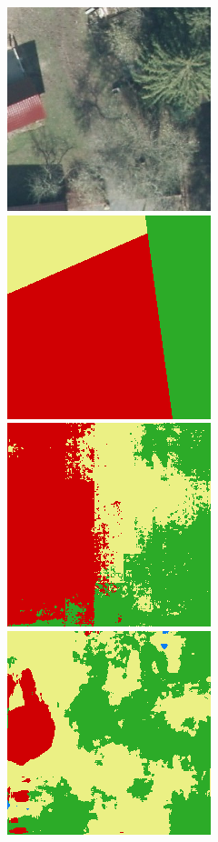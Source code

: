 \begin{figure}
    \vspace{3mm}
    \includegraphics[width=\DensenetPredictionsImageWidth]{images/densenet/768909-image} \hfill
    \includegraphics[width=\DensenetPredictionsImageWidth]{images/densenet/768909-label} \hfill
    \includegraphics[width=\DensenetPredictionsImageWidth]{images/densenet/densenet-103D/768909-prediction} \hfill
    \includegraphics[width=\DensenetPredictionsImageWidth]{images/densenet/densenet-103CD/768909-prediction} \hfill

\end{figure}
